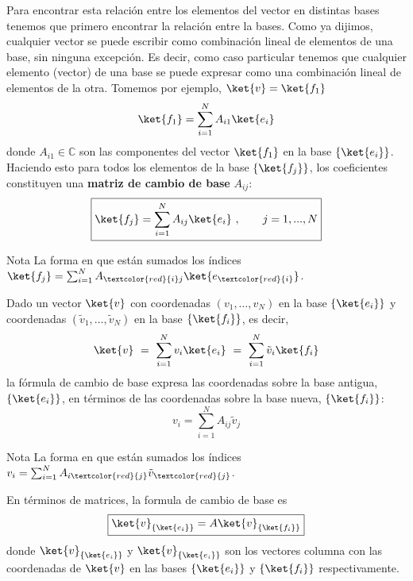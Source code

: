 \documentclass[a4paper,11pt]{book} %
\numberwithin{equation}{chapter}
\begin{document}
Para encontrar esta relación entre los elementos del vector en distintas bases tenemos que primero encontrar la relación entre la  bases. Como ya dijimos, cualquier vector se puede escribir como combinación lineal de elementos de una base, sin ninguna excepción. Es decir, como caso particular tenemos que cualquier elemento (vector) de una base se puede expresar como una combinación lineal de elementos de la otra. Tomemos por ejemplo, $\ket{v}= \ket{f_1}$
	\begin{equation}
	\ket{f_1} = \sum_{i=1}^N A_{ i 1} \ket{e_i}
	\end{equation}
donde $A_{ i 1}\in \mathbb{C}$ son las componentes del vector $\ket{f_1}$ en la base $\{\ket{e_i}\}$. Haciendo esto para todos los elementos de la base $\{\ket{f_j}\}$, los coeficientes constituyen una \textbf{matriz de cambio de base} $A_{ij}$:
	\begin{equation} \label{ec_formalismo_cambio_base_base}
	\boxed{\ket{f_j} = \sum_{i=1}^N A_{ i j} \ket{e_i} ~,~~~~~~j=1,..., N}
	\end{equation}
	\begin{mybox_blue}{Nota}
	La forma en que están sumados los índices $\ket{f_j} = \sum_{i=1}^N A_{ \textcolor{red}{i} j} \ket{e_{\textcolor{red}{i}}}$.
	\end{mybox_blue}
Dado un vector $\ket{v}$ con coordenadas $(v_1,\dots,v_N)$ en la base $\{\ket{e_i}\}$ y coordenadas $(\tilde{v}_1,\dots,\tilde{v}_N)$ en la base $\{\ket{f_i}\}$, es decir,
$$
\ket{v} ~=~ \sum_{i=1}^N v_i \ket{e_i} ~=~ \sum_{i=1}^N \tilde{v}_i \ket{f_i}
$$
la fórmula de cambio de base expresa las coordenadas sobre la base antigua, $\{\ket{e_i}\}$, en términos de las coordenadas sobre la base nueva, $\{\ket{f_i}\}$:
	\begin{equation} \label{ec_formalismo_cambio_de_base}
	\boxed{v_i = \sum_{i=1}^N A_{ij} \tilde{v}_j}
	\end{equation}
	\begin{mybox_blue}{Nota}
	La forma en que están sumados los índices $v_i = \sum_{i=1}^N A_{i\textcolor{red}{j}} \tilde{v}_{\textcolor{red}{j}} $.
	\end{mybox_blue}
En términos de matrices, la formula de cambio de base es
	\begin{equation}
	\boxed{\ket{v}_{\{\ket{e_i}\}} = A \ket{v}_{\{\ket{f_i}\}}}
	\end{equation}
	donde $\ket{v}_{\{\ket{e_i}\}}$ y $\ket{v}_{\{\ket{e_i}\}}$ son los vectores columna con las coordenadas de $\ket{v}$  en las bases $\{\ket{e_i}\}$ y $\{\ket{f_i}\}$ respectivamente. 
\end{document}
